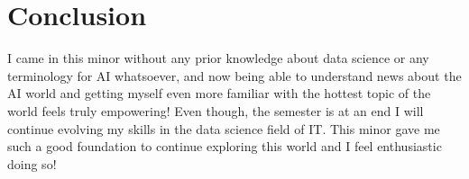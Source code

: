 \documentclass{article}
\begin{document}
\section{Conclusion} %
I came in this minor without any prior knowledge about data science or any terminology for AI whatsoever, and now being able to understand news about the AI world and getting myself even more familiar with the hottest topic of the world feels truly empowering! Even though, the semester is at an end I will continue evolving my skills in the data science field of IT. This minor gave me such a good foundation to continue exploring this world and I feel enthusiastic doing so!
\end{document}
